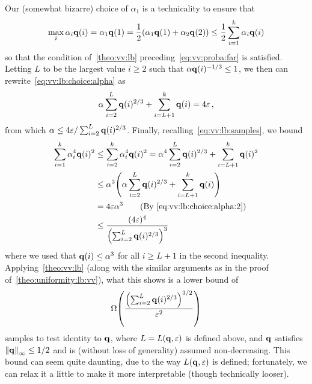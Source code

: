 \noindent Our (somewhat bizarre) choice of $\alpha_1$ is a technicality to ensure that
\[
	\max_i \alpha_i\mathbf{q}(i) = \alpha_1\mathbf{q}(1) = \frac{1}{2}(\alpha_1\mathbf{q}(1)+\alpha_2\mathbf{q}(2)) \leq \frac{1}{2}\sum_{i=1}^k \alpha_i\mathbf{q}(i)
\]
so that the condition of~\cref{theo:vv:lb} preceding~\cref{eq:vv:proba:far} is satisfied. Letting $L$ to be the largest value $i\geq 2$ such that $\alpha\mathbf{q}(i)^{-1/3} \leq 1$, we then can rewrite~\cref{eq:vv:lb:choice:alpha} as
\begin{equation}
	\label{eq:vv:lb:choice:alpha:2}
	\alpha\sum_{i=2}^L \mathbf{q}(i)^{2/3} + \sum_{i=L+1}^k \mathbf{q}(i) = 4\varepsilon\,,
\end{equation}
from which $\alpha \leq 4\varepsilon/\sum_{i=2}^L \mathbf{q}(i)^{2/3}$. Finally, recalling~\cref{eq:vv:lb:samples}, we bound
\begin{align}
	\sum_{i=1}^\ab \alpha_i^4\q(i)^2
	&\leq \sum_{i=2}^\ab \alpha_i^4\q(i)^2
	= \alpha^4\sum_{i=2}^L \q(i)^{2/3} + \sum_{i=L+1}^\ab \q(i)^2 \notag\\
	&\leq \alpha^3\Paren{\alpha\sum_{i=2}^L \q(i)^{2/3} + \sum_{i=L+1}^\ab \q(i) } \notag\\
	&= 4\dst \alpha^3 \tag{By~\cref{eq:vv:lb:choice:alpha:2}}\\
	&\leq \frac{(4\dst)^4}{\Paren{\sum_{i=2}^L \q(i)^{2/3}}^3}
\end{align}
where we used that $\mathbf{q}(i) \leq \alpha^3$ for all $i \geq L+1$ in the second inequality. Applying~\cref{theo:vv:lb} (along with the similar arguments as in the proof of~\cref{theo:uniformity:lb:vv}), what this shows is a lower bound of
\begin{equation}
	\label{eq:vv:lb:complicated}
	\bigOmega{ \frac{\Paren{\sum_{i=2}^L \q(i)^{2/3}}^{3/2}}{\dst^2}}
\end{equation}
samples to test identity to $\mathbf{q}$, where $L=L(\mathbf{q},\varepsilon)$ is defined above, and $\mathbf{q}$ satisfies $\norminf{\q}\leq 1/2$ and is (without loss of generality) assumed non-decreasing. This bound can seem quite daunting, due to the way $L(\mathbf{q},\varepsilon)$ is defined; fortunately, we can relax it a little to make it more interpretable (though technically looser). 

